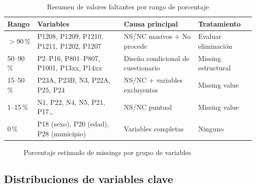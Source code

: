 \documentclass[12pt,a4paper]{article}
\newcommand{\thead}[1]{\cellcolor{tableheader}\color{white}\textbf{#1}}
\begin{document}
\vspace{0.5em}
\begin{table}[H]
\centering
\renewcommand{\arraystretch}{1.3}
\begin{tabularx}{\linewidth}{p{2.5cm} p{5cm} p{4cm} X}
\toprule
\thead{Rango} & \thead{Variables} & \thead{Causa principal} & \thead{Tratamiento} \\
\midrule
$>$90\,\%        & P1208, P1209, P1210, P1211, P1202, P1207 & NS/NC masivos + No procede & Evaluar eliminación \\
\rowcolor{tablerow}
50--90\,\%       & P2--P16, P801--P807, P1001, P13xx, P14xx & Diseño condicional de cuestionario & Missing estructural \\
15--50\,\%       & P23A, P23B, N3, P22A, P25, P24 & NS/NC + variables excluyentes & Missing value \\
\rowcolor{tablerow}
1--15\,\%        & N1, P22, N4, N5, P21, P17\ldots & NS/NC puntual & Missing value \\
0\,\%            & P18 (sexo), P20 (edad), P28 (municipio) & Variables completas & Ninguno \\
\bottomrule
\end{tabularx}
\caption{Resumen de valores faltantes por rango de porcentaje}
\end{table}

\begin{figure}[H]
\centering
{}
\caption{Porcentaje estimado de missings por grupo de variables}
\end{figure}

\subsection{Distribuciones de variables clave}
\end{document}
